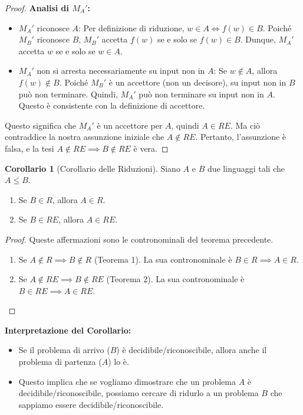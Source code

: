 \documentclass[a4paper]{article}
\theoremstyle{definition} %
\newtheorem{corollary}[theorem]{Corollario} %
\begin{document}
\begin{proof}
\textbf{Analisi di $M_A'$:}
\begin{itemize}
    \item $M_A'$ riconosce $A$: Per definizione di riduzione, $w \in A \iff f(w) \in B$. Poiché $M_B'$ riconosce $B$, $M_B'$ accetta $f(w)$ se e solo se $f(w) \in B$. Dunque, $M_A'$ accetta $w$ se e solo se $w \in A$.
    \item $M_A'$ non si arresta necessariamente su input non in $A$: Se $w \notin A$, allora $f(w) \notin B$. Poiché $M_B'$ è un accettore (non un decisore), su input non in $B$ può non terminare. Quindi, $M_A'$ può non terminare su input non in $A$. Questo è consistente con la definizione di accettore.
\end{itemize}
Questo significa che $M_A'$ è un accettore per $A$, quindi $A \in RE$.
Ma ciò contraddice la nostra assunzione iniziale che $A \notin RE$.
Pertanto, l'assunzione è falsa, e la tesi $A \notin RE \implies B \notin RE$ è vera.
\end{proof}

\begin{corollary}[Corollario delle Riduzioni]
Siano $A$ e $B$ due linguaggi tali che $A \le B$.
\begin{enumerate}
    \item Se $B \in R$, allora $A \in R$.
    \item Se $B \in RE$, allora $A \in RE$.
\end{enumerate}
\end{corollary}
\begin{proof}
Queste affermazioni sono le contronominali del teorema precedente.
\begin{enumerate}
    \item Se $A \notin R \implies B \notin R$ (Teorema 1). La sua contronominale è $B \in R \implies A \in R$.
    \item Se $A \notin RE \implies B \notin RE$ (Teorema 2). La sua contronominale è $B \in RE \implies A \in RE$.
\end{enumerate}
\end{proof}

\textbf{Interpretazione del Corollario:}
\begin{itemize}
    \item Se il problema di arrivo ($B$) è decidibile/riconoscibile, allora anche il problema di partenza ($A$) lo è.
    \item Questo implica che se vogliamo dimostrare che un problema $A$ è decidibile/riconoscibile, possiamo cercare di ridurlo a un problema $B$ che sappiamo essere decidibile/riconoscibile.
\end{itemize}
\end{document}
